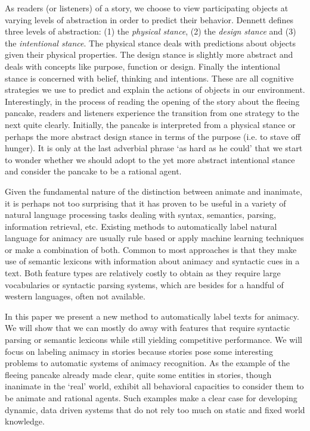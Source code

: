 \documentclass[a4paper,UKenglish]{oasics}
\begin{document}
As readers (or listeners) of a story, we choose to view participating
objects at varying levels of abstraction in order to predict their
behavior. Dennett \cite{dennett:96} defines three levels of
abstraction: (1) the \textit{physical stance}, (2) the \textit{design
  stance} and (3) the \textit{intentional stance}. The physical stance
deals with predictions about objects given their physical
properties. The design stance is slightly more abstract and deals with
concepts like purpose, function or design. Finally the intentional
stance is concerned with belief, thinking and intentions. These are
all cognitive strategies we use to predict and explain the actions of
objects in our environment. Interestingly, in the process of reading
the opening of the story about the fleeing pancake, readers and
listeners experience the transition from one strategy to the next
quite clearly. Initially, the pancake is interpreted from a physical
stance or perhaps the more abstract design stance in terms of the
purpose (i.e. to stave off hunger). It is only at the last adverbial
phrase `as hard as he could' that we start to wonder whether we should
adopt to the yet more abstract intentional stance and consider the
pancake to be a rational agent.

Given the fundamental nature of the distinction between animate and
inanimate, it is perhaps not too surprising that it has proven to be
useful in a variety of natural language processing tasks dealing with
syntax, semantics, parsing, information retrieval, etc. Existing
methods to automatically label natural language for animacy are
usually rule based or apply machine learning techniques or make a
combination of both. Common to most approaches is that they make use
of semantic lexicons with information about animacy and syntactic cues
in a text. Both feature types are relatively costly to obtain as they
require large vocabularies or syntactic parsing systems, which are
besides for a handful of western languages, often not available.

In this paper we present a new method to automatically label texts for
animacy. We will show that we can mostly do away with features that
require syntactic parsing or semantic lexicons while still yielding
competitive performance. We will focus on labeling animacy in stories
because stories pose some interesting problems to automatic systems of
animacy recognition. As the example of the fleeing pancake already
made clear, quite some entities in stories, though inanimate in the
`real' world, exhibit all behavioral capacities to consider them to be
animate and rational agents. Such examples make a clear case for
developing dynamic, data driven systems that do not rely too much on
static and fixed world knowledge.
\end{document}
